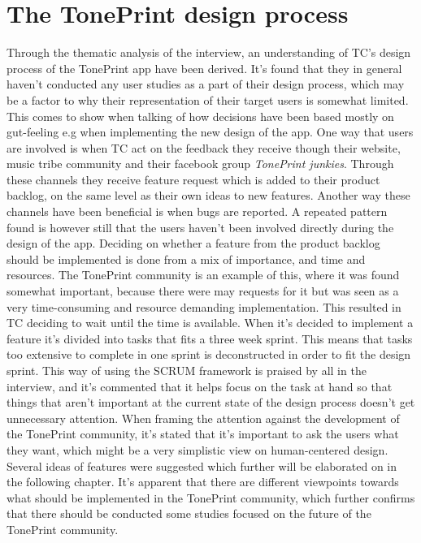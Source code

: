 \section{The TonePrint design process}
\label{TonePrintDevelopmentProcess}
Through the thematic analysis of the interview, an understanding of TC's design process of the TonePrint app have been derived. It's found that they in general haven't conducted any user studies as a part of their design process, which may be a factor to why their representation of their target users is somewhat limited. This comes to show when talking of how decisions have been based mostly on gut-feeling e.g when implementing the new design of the app. One way that users are involved is when TC act on the feedback they receive though their website, music tribe community and their facebook group \textit{TonePrint junkies}. Through these channels they receive feature request which is added to their product backlog, on the same level as their own ideas to new features. Another way these channels have been beneficial is when bugs are reported. A repeated pattern found is however still that the users haven't been involved directly during the design of the app. Deciding on whether a feature from the product backlog should be implemented is done from a mix of importance, and time and resources. The TonePrint community is an example of this, where it was found somewhat important, because there were may requests for it but was seen as a very time-consuming and resource demanding implementation. This resulted in TC deciding to wait until the time is available. When it's decided to implement a feature it's divided into tasks that fits a three week sprint. This means that tasks too extensive to complete in one sprint is deconstructed in order to fit the design sprint. This way of using the SCRUM framework is praised by all in the interview, and it's commented that it helps focus on the task at hand so that things that aren't important at the current state of the design process doesn't get unnecessary attention. When framing the attention against the development of the TonePrint community, it's stated that it's important to ask the users what they want, which might be a very simplistic view on human-centered design. Several ideas of features were suggested which further will be elaborated on in the following chapter. It's apparent that there are different viewpoints towards what should be implemented in the TonePrint community, which further confirms that there should be conducted some studies focused on the future of the TonePrint community. 




